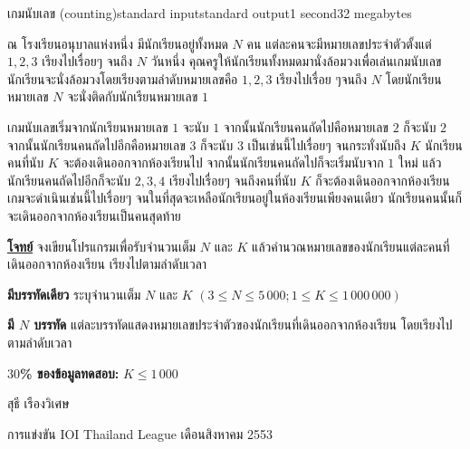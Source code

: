 \documentclass[11pt,a4paper]{article}
\begin{document}
\begin{problem}{เกมนับเลข (counting)}{standard input}{standard output}{1 second}{32 megabytes}

ณ โรงเรียนอนุบาลแห่งหนึ่ง มีนักเรียนอยู่ทั้งหมด $N$ คน แต่ละคนจะมีหมายเลขประจำตัวตั้งแต่ $1, 2, 3$ เรียงไปเรื่อยๆ จนถึง $N$ วันหนึ่ง คุณครูให้นักเรียนทั้งหมดมานั่งล้อมวงเพื่อเล่นเกมนับเลข นักเรียนจะนั่งล้อมวงโดยเรียงตามลำดับหมายเลขคือ $1, 2, 3$ เรียงไปเรื่อย ๆจนถึง $N$ โดยนักเรียนหมายเลข $N$ จะนั่งติดกับนักเรียนหมายเลข $1$ 

เกมนับเลขเริ่มจากนักเรียนหมายเลข $1$ จะนับ $1$ จากนั้นนักเรียนคนถัดไปคือหมายเลข $2$ ก็จะนับ $2$ จากนั้นนักเรียนคนถัดไปอีกคือหมายเลข $3$ ก็จะนับ $3$ เป็นเช่นนี้ไปเรื่อยๆ จนกระทั่งนับถึง $K$ นักเรียนคนที่นับ $K$ จะต้องเดินออกจากห้องเรียนไป จากนั้นนักเรียนคนถัดไปก็จะเริ่มนับจาก $1$ ใหม่ แล้วนักเรียนคนถัดไปอีกก็จะนับ $2, 3, 4$ เรียงไปเรื่อยๆ จนถึงคนที่นับ $K$ ก็จะต้องเดินออกจากห้องเรียน เกมจะดำเนินเช่นนี้ไปเรื่อยๆ จนในที่สุดจะเหลือนักเรียนอยู่ในห้องเรียนเพียงคนเดียว นักเรียนคนนั้นก็จะเดินออกจากห้องเรียนเป็นคนสุดท้าย

\bigskip
\underline{\textbf{โจทย์}}  จงเขียนโปรแกรมเพื่อรับจำนวนเต็ม $N$ และ $K$ แล้วคำนวณหมายเลขของนักเรียนแต่ละคนที่เดินออกจากห้องเรียน เรียงไปตามลำดับเวลา


\InputFile

\textbf{มีบรรทัดเดียว} ระบุจำนวนเต็ม $N$ และ $K$ $(3 \leq N \leq 5\,000; 1 \leq K \leq 1\,000\,000)$


\OutputFile

\textbf{มี $N$ บรรทัด} แต่ละบรรทัดแสดงหมายเลขประจำตัวของนักเรียนที่เดินออกจากห้องเรียน โดยเรียงไปตามลำดับเวลา

\Examples

\begin{example}
%
%
\end{example}

\Scoring

\textbf{$30$\% ของข้อมูลทดสอบ:} $K \leq 1\,000$
  
\Source

สุธี เรืองวิเศษ

การแข่งขัน IOI Thailand League เดือนสิงหาคม 2553

\end{problem}
\end{document}
